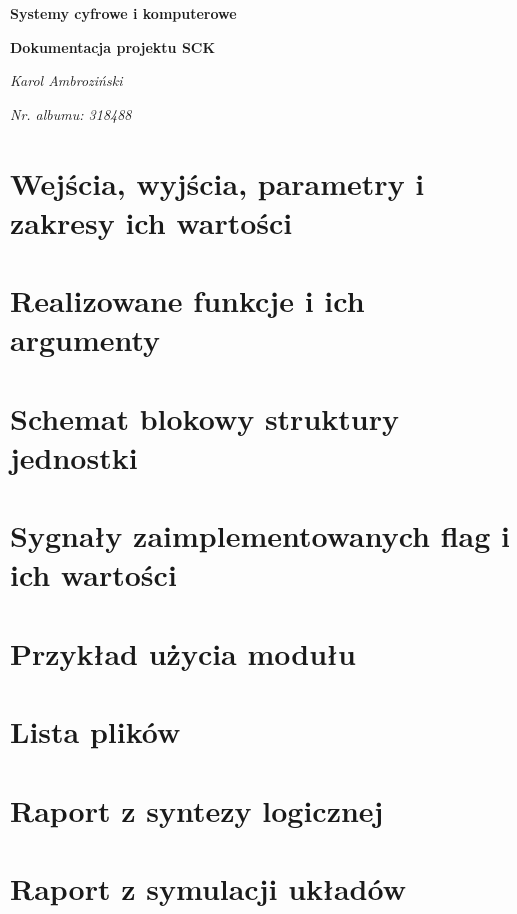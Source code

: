 \documentclass[12pt]{article}
\title{}
\author{}
\date{}
\begin{document}
	\begin{titlepage}
		\centering
		\vspace{1cm}
		{\huge\bfseries Systemy cyfrowe i komputerowe\par}
		\vspace{0.5cm}
		{\huge\bfseries Dokumentacja projektu SCK\par}
		\vspace{2cm}
		{\Large\itshape Karol Ambroziński\par}
		\vspace{0cm}
		{\Large\itshape Nr. albumu: 318488\par}
		\vfill
	\end{titlepage}

	\tableofcontents
	
	\newpage
	\section{Wejścia, wyjścia, parametry i zakresy ich wartości}
	\blindtext
	
	
	
	\section{Realizowane funkcje i ich argumenty}
	\blindtext
	\section{Schemat blokowy struktury jednostki}
	\blindtext
	\section{Sygnały zaimplementowanych flag i ich wartości}
	\blindtext
	\section{Przykład użycia modułu}
	\blindtext
	\section{Lista plików}
	\blindtext
	\section{Raport z syntezy logicznej}
	\blindtext
	\section{Raport z symulacji układów}
	\blindtext
	
\end{document}

